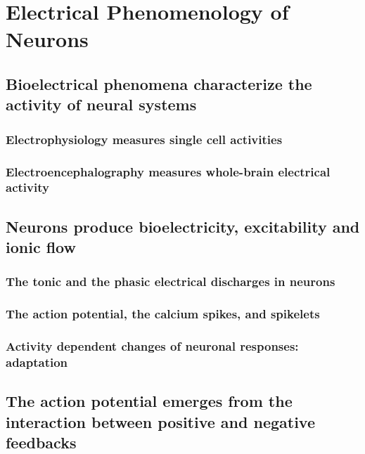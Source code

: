 \chapter{Electrical Phenomenology of Neurons}
\label{phen} %

\section{Bioelectrical phenomena characterize the activity of neural systems}
\subsection{Electrophysiology measures single cell activities}
\subsection{Electroencephalography measures whole-brain electrical activity}


\section{Neurons produce bioelectricity, excitability and ionic flow}
\subsection{The tonic and the phasic electrical discharges in neurons}
\subsection{The action potential, the calcium spikes, and spikelets}
\subsection{Activity dependent changes of neuronal responses: adaptation}

\section{The action potential emerges from the interaction between positive and negative feedbacks}
